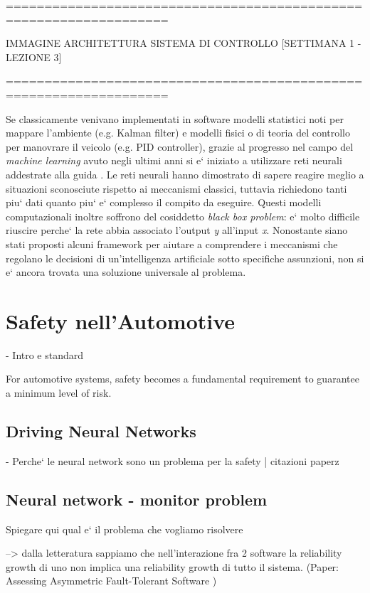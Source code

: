 ===================================================================

IMMAGINE ARCHITETTURA SISTEMA DI CONTROLLO
[SETTIMANA 1 - LEZIONE 3]

===================================================================
\newline\newline

Se classicamente venivano implementati in software modelli statistici noti per mappare l'ambiente (e.g. Kalman filter) e modelli fisici o di teoria del controllo per manovrare il veicolo (e.g. PID controller), grazie al progresso nel campo del \textsl{machine learning} avuto negli ultimi anni si e` iniziato a utilizzare reti neurali addestrate alla guida \cite{1} \cite{2}.\newline
Le reti neurali hanno dimostrato di sapere reagire meglio a situazioni sconosciute rispetto ai meccanismi classici, tuttavia richiedono tanti piu` dati quanto piu` e` complesso il compito da eseguire.\newline
Questi modelli computazionali inoltre soffrono del cosiddetto \textsl{black box problem}: e` molto difficile riuscire perche` la rete abbia associato l'output \textsl{y} all'input \textsl{x}. Nonostante siano stati proposti alcuni framework \cite{3} per aiutare a comprendere i meccanismi che regolano le decisioni di un'intelligenza artificiale sotto specifiche assunzioni, non si e` ancora trovata una soluzione universale al problema.\newline


\section{Safety nell'Automotive}

-  Intro e standard

For automotive systems, safety becomes a fundamental requirement to guarantee a minimum level of risk.\newline


\subsection{Driving Neural Networks}

 - Perche` le neural network sono un problema per la safety | citazioni paperz

\subsection{Neural network - monitor problem}

Spiegare qui qual e` il problema che vogliamo risolvere

--> dalla letteratura sappiamo che nell'interazione fra 2 software la reliability growth di uno non implica una reliability growth di tutto il sistema. (Paper: Assessing Asymmetric Fault-Tolerant Software )

